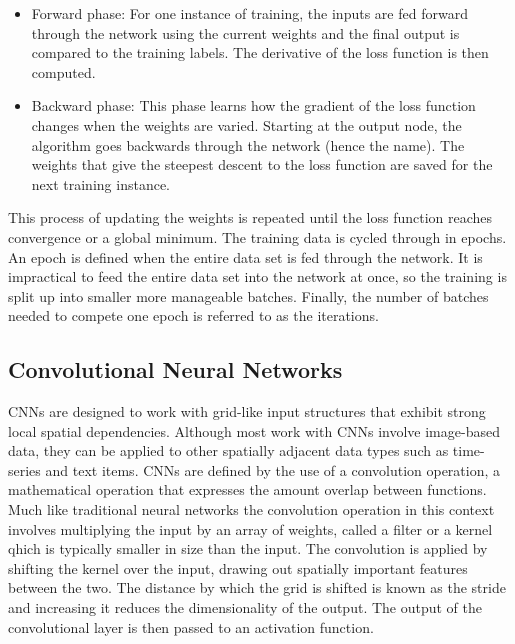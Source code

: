 \documentclass[12pt]{iopart}
\begin{document}
\begin{itemize}
\item Forward phase: For one instance of training, the inputs are fed forward through the network using the current weights and the final output is compared to the training labels. The derivative of the loss function is then computed.
\item Backward phase: This phase learns how the gradient of the loss function changes when the weights are varied. Starting at the output node, the algorithm goes backwards through the network (hence the name). The weights that give the steepest descent to the loss function are saved for the next training instance.  
\end{itemize}
This process of updating the weights is repeated until the loss function reaches convergence or a global minimum. The training data is cycled through in epochs. An epoch is defined when the entire data set is fed through the network. It is impractical to feed the entire data set into the network at once, so the training is split up into smaller more manageable batches. Finally, the number of batches needed to compete one epoch is referred to as the iterations.


\subsection{Convolutional Neural Networks}
%
\acp{CNN} are designed to work with grid-like input structures that exhibit
strong local spatial dependencies. Although most work with \acp{CNN}
involve image-based data, they can be applied to other spatially adjacent data
types such as time-series and text items. \acp{CNN} are defined by the use of a
convolution operation, a mathematical operation that expresses the amount
overlap between functions. Much like traditional neural networks the convolution operation in this context involves multiplying the input by an array of weights, called a filter or a kernel qhich is typically smaller in size than the input. The convolution is applied by shifting the kernel over the input, drawing out spatially important features between the
two. The distance by which the grid is shifted is known as
the stride and increasing it reduces the dimensionality of the
output. The output of the convolutional layer is then passed to an activation function.
\end{document}
